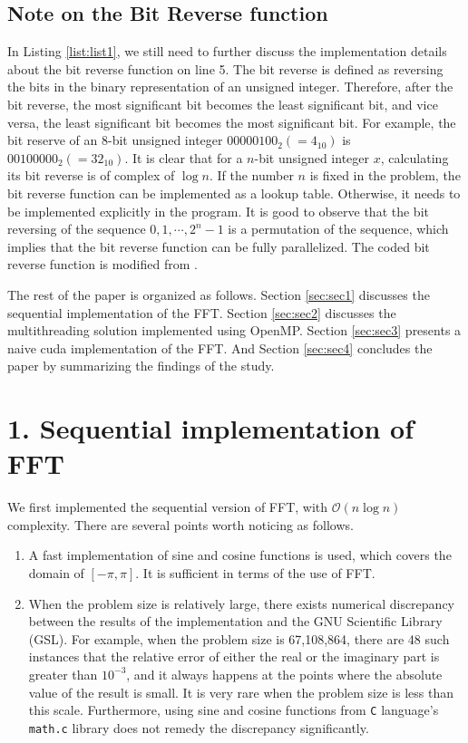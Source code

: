 \documentclass[amsmath,amssymb]{revtex4}
\begin{document}
\subsection{\label{subsec:subsec1.1}Note on the Bit Reverse function}
In Listing \ref{list:list1}, we still need to further discuss the implementation details about the bit reverse function on line 5. The bit reverse is defined as reversing the bits in the binary representation of an unsigned integer. Therefore, after the bit reverse, the most significant bit becomes the least significant bit, and vice versa, the least significant bit becomes the most significant bit. For example, the bit reserve of an 8-bit unsigned integer $00000100_2(=4_{10})$ is $00100000_2(=32_{10})$. It is clear that for a $n$-bit unsigned integer $x$, calculating its bit reverse is of complex of $\log n$. If the number $n$ is fixed in the problem, the bit reverse function can be implemented as a lookup table. Otherwise, it needs to be implemented explicitly in the program. It is good to observe that the bit reversing of the sequence $0, 1, \cdots, 2^n-1$ is a permutation of the sequence, which implies that the bit reverse function can be fully parallelized. The coded bit reverse function is modified from \cite{ref:bitreverse}.

The rest of the paper is organized as follows. Section \ref{sec:sec1} discusses the sequential implementation of the FFT. Section \ref{sec:sec2} discusses the multithreading solution implemented using OpenMP. Section \ref{sec:sec3} presents a naive cuda implementation of the FFT. And Section  \ref{sec:sec4} concludes the paper by summarizing the findings of the study.

\section{\label{sec:sec1}1. Sequential implementation of FFT}
We first implemented the sequential version of FFT, with $\mathcal{O}(n\log n)$ complexity.
There are several points worth noticing as follows.
\begin{enumerate}
\item A fast implementation of sine and cosine functions is used, which covers the domain of $[-\pi, \pi]$. It is sufficient in terms of the use of FFT.
\item When the problem size is relatively large, there exists numerical discrepancy between the results of the implementation and the GNU Scientific Library (GSL). For example, when the problem size is 67,108,864, there are 48 such instances that the relative error of either the real or the imaginary part is greater than $10^{-3}$, and it always happens at the points where the absolute value of the result is small. It is very rare when the problem size is less than this scale. Furthermore, using sine and cosine functions from {\tt C} language's {\tt math.c} library does not remedy the discrepancy significantly.
\end{enumerate}
\end{document}
